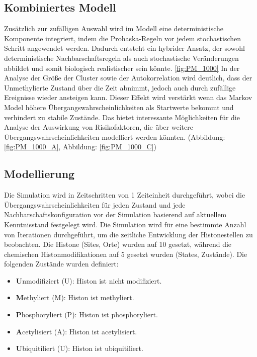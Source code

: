 \documentclass{SeminarV2}
\begin{document}
\subsection{Kombiniertes Modell}
Zusätzlich zur zufälligen Auswahl wird im Modell eine deterministische Komponente integriert, indem die Prohaska-Regeln vor jedem stochastischen Schritt angewendet werden. Dadurch entsteht ein hybrider Ansatz, der sowohl deterministische Nachbarschaftsregeln als auch stochastische Veränderungen abbildet und somit biologisch realistischer sein könnte.
\ref{fig:PM_1000}
In der Analyse der Größe der Cluster sowie der Autokorrelation wird deutlich, dass der Unmethylierte Zustand über die Zeit abnimmt, jedoch auch durch zufällige Ereignisse wieder ansteigen kann. Dieser Effekt wird verstärkt wenn das Markov Model höhere Übergangswahrscheinlichkeiten als Startwerte bekommt und verhindert zu stabile Zustände.
Das bietet interessante Möglichkeiten für die Analyse der Auswirkung von Risikofaktoren, die über weitere Übergangswahrscheinlichkeiten modelliert werden könnten. (Abbildung: \ref{fig:PM_1000_A}, Abbildung: \ref{fig:PM_1000_C})

\subsection{Modellierung}
Die Simulation wird in Zeitschritten von 1 Zeiteinheit durchgef\"{u}hrt, wobei die \"{U}bergangswahrscheinlichkeiten f\"{u}r jeden Zustand und jede Nachbarschaftskonfiguration 
vor der Simulation basierend auf aktuellem Kenntnisstand festgelegt wird.
Die Simulation wird f\"{u}r eine bestimmte Anzahl von Iterationen durchgef\"{u}hrt, um die zeitliche Entwicklung der Histonestellen zu beobachten.
Die Histone (Sites, Orte) wurden auf 10 gesetzt, während die chemischen Histonmodifikationen auf 5 gesetzt wurden (States, Zustände).
Die folgenden Zust\"{a}nde wurden definiert:
\begin{itemize}
  \item \textbf{U}nmodifiziert (U): Histon ist nicht modifiziert.
  \item \textbf{M}ethyliert (M): Histon ist methyliert.
  \item \textbf{P}hosphoryliert (P): Histon ist phosphoryliert.
  \item \textbf{A}cetylisiert (A): Histon ist acetylisiert.
  \item \textbf{U}biquitiliert (U): Histon ist ubiquitiliert.
\end{itemize}
\end{document}
